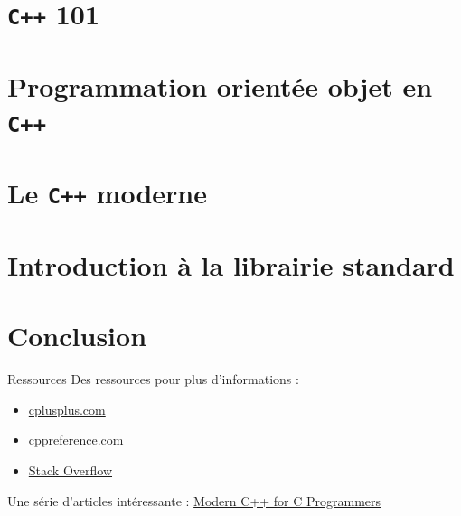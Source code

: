 \documentclass{beamer}
\numberwithin{equation}{section}
\begin{document}
\section{\texttt{C++} 101}
\label{sec:cpp101}



\section{Programmation orientée objet en \texttt{C++}}
\label{sec:poo}



\section{Le \texttt{C++} moderne}
\label{sec:cpp-moderne}



\section{Introduction à la librairie standard}
\label{sec:cpp-std}



\section*{Conclusion}
\label{sec:conclusion}
\begin{frame}{Ressources}
  Des ressources pour plus d'informations :
  \begin{itemize}
  \item \href{http://www.cplusplus.com/}{cplusplus.com}
  \item \href{https://en.cppreference.com/w/}{cppreference.com}
  \item \href{https://stackoverflow.com/}{Stack Overflow}
  \end{itemize}

  Une série d'articles intéressante : \href{https://ds9a.nl/articles/posts/cpp-intro/}{Modern C++ for C Programmers}
\end{frame}
\end{document}
